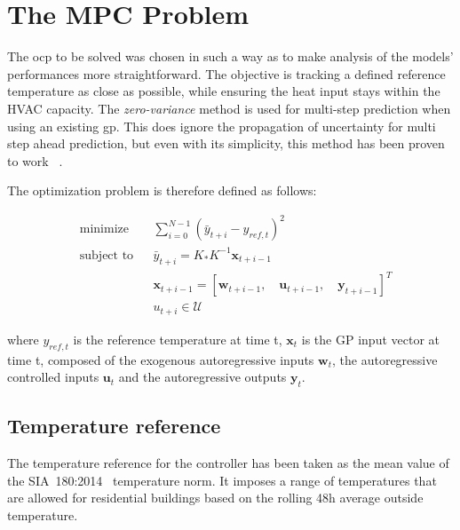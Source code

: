 \section{The MPC Problem}\label{sec:mpc_problem}

The \acrlong{ocp} to be solved was chosen in such a way as to make
analysis of the models' performances more straightforward. The objective is
tracking a defined reference temperature as close as possible, while ensuring
the heat input stays within the HVAC capacity. The \textit{zero-variance} method
is used for multi-step prediction when using an existing \acrshort{gp}. This
does ignore the propagation of uncertainty for multi step ahead prediction, but
even with its simplicity, this method has been proven to work
~\cite{kocijanModellingControlDynamic2016,jainLearningControlUsing2018,
pleweSupervisoryModelPredictive2020}.

The optimization problem is therefore defined as follows:

\begin{subequations}\label{eq:optimal_control_problem}
    \begin{align}
        & \text{minimize}
        & & \sum_{i=0}^{N-1} (\bar{y}_{t+i} - y_{ref, t})^2 \\
        & \text{subject to}
        & & \bar{y}_{t+i} = K_*K^{-1}\mathbf{x}_{t+i-1} \\
        &&& \mathbf{x}_{t+i-1} = \left[\mathbf{w}_{t+i-1},\quad
        \mathbf{u}_{t+i-1},\quad \mathbf{y}_{t+i-1}\right]^T \\
        \label{eq:components}
        &&& u_{t+i} \in \mathcal{U}
    \end{align}
\end{subequations}

where $y_{ref, t}$ is the reference temperature at time t, $\mathbf{x}_{t}$ is
the GP input vector at time t, composed of the exogenous autoregressive inputs
$\mathbf{w}_{t}$, the autoregressive controlled inputs $\mathbf{u}_{t}$ and the
autoregressive outputs $\mathbf{y}_{t}$.

\subsection{Temperature reference}

The temperature reference for the controller has been taken as the mean value of
the SIA~180:2014~\cite{sia180:2014ProtectionThermiqueProtection2014} temperature
norm. It imposes a range of temperatures that are allowed for residential
buildings based on the rolling 48h average outside temperature.


